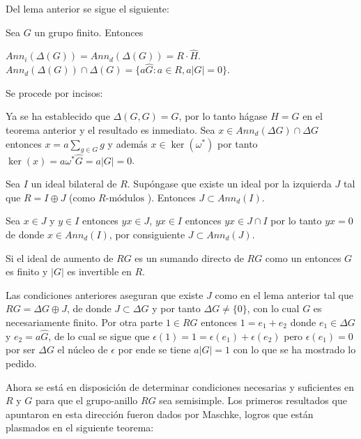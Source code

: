 Del lema anterior se sigue el siguiente:

\begin{corolario}
Sea $G$ un grupo finito. Entonces 

\begin{enumerate}
\newItem $Ann_i (\Delta(G)) = Ann_d(\Delta(G)) = R\cdot \hat{H}$.
\newItem $Ann_d(\Delta(G)) \cap \Delta (G) = \{ a\hat{G} : a \in R , a|G| = 0\}$.
\end{enumerate}
\end{corolario}


\begin{proof*}
Se procede por incisos:
\begin{bulletList}
\newItem Ya se ha establecido que $\Delta(G,G) = G$, por lo tanto hágase $H=G$ en el teorema anterior y el resultado es inmediato.
\newItem Sea $x \in Ann_d(\Delta G) \cap \Delta G$ entonces $x = a\sum_{g\in G}g$ y además $x \in \ker(\omega^*)$ por tanto $\ker(x)= a\omega^*\hat{G} = a|G| = 0 $. \qedhere
\end{bulletList}
\end{proof*}
\begin{lema}
Sea $I$ un ideal bilateral de $R$. Supóngase que existe un ideal por la izquierda $J$ tal que $R = I \oplus J$ (como $R\mbox{-módulos}$ ). Entonces $J \subset Ann_d(I) $.
\end{lema}
\begin{proof*}
Sea $x \in J$ y $y \in I $ entonces $yx \in J$, $yx \in I$ entonces $yx \in J\cap I$ por lo tanto $yx=0$ de donde $x \in Ann_d(I)$, por consiguiente $J \subset Ann_d(J)$. \qedhere 
\end{proof*}
\begin{lema}\label{aumento}
Si el ideal de aumento de $RG$ es un sumando directo de $RG$ como un  entonces $G$ es finito y $|G|$ es invertible en $R$.
\end{lema}
\begin{proof*}
Las condiciones anteriores aseguran que existe $J$ como en el lema anterior tal que $RG = \Delta G \oplus J$, de donde $J \subset \Delta G$  y por tanto $\Delta G \neq \{ 0 \}$, con lo cual $G$ es necesariamente finito.
Por otra parte $1 \in RG$ entonces $1 = e_1 + e_2$ donde $e_1 \in \Delta G$ y $e_2=a\hat{G}$, de lo cual se sigue que $\epsilon(1) = 1 = \epsilon(e_1) + \epsilon(e_2)$ pero $\epsilon(e_1) = 0$ por ser $\Delta G$ el núcleo de $\epsilon$ por ende se tiene $a|G| = 1$ con lo que se ha mostrado lo pedido. \qedhere
\end{proof*}
Ahora se está en disposición de determinar condiciones necesarias y suficientes en $R$ y $G$ para que el grupo-anillo $RG$ sea semisimple. Los primeros resultados que apuntaron en esta dirección fueron dados por Maschke, logros que están plasmados en el siguiente teorema:
